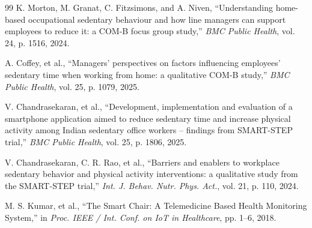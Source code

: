 \documentclass[conference]{IEEEtran}
\begin{document}
\begin{thebibliography}{99}
 K. Morton, M. Granat, C. Fitzsimons, and A. Niven, ``Understanding home-based occupational sedentary behaviour and how line managers can support employees to reduce it: a COM-B focus group study,'' \textit{BMC Public Health}, vol. 24, p. 1516, 2024.

 A. Coffey, et al., ``Managers' perspectives on factors influencing employees' sedentary time when working from home: a qualitative COM-B study,'' \textit{BMC Public Health}, vol. 25, p. 1079, 2025.

 V. Chandrasekaran, et al., ``Development, implementation and evaluation of a smartphone application aimed to reduce sedentary time and increase physical activity among Indian sedentary office workers -- findings from SMART-STEP trial,'' \textit{BMC Public Health}, vol. 25, p. 1806, 2025.

 V. Chandrasekaran, C. R. Rao, et al., ``Barriers and enablers to workplace sedentary behavior and physical activity interventions: a qualitative study from the SMART-STEP trial,'' \textit{Int. J. Behav. Nutr. Phys. Act.}, vol. 21, p. 110, 2024.

 M. S. Kumar, et al., ``The Smart Chair: A Telemedicine Based Health Monitoring System,'' in \textit{Proc. IEEE / Int. Conf. on IoT in Healthcare}, pp. 1--6, 2018.
\end{thebibliography}
\end{document}
